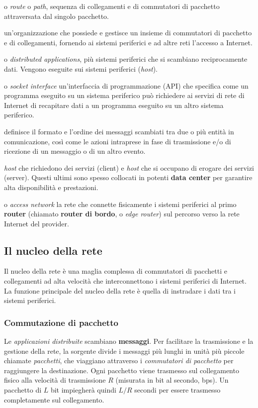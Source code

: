 \begin{description}[font=\sffamily\bfseries, leftmargin=1cm, style=nextline]
  \item[percorso]
    o \textit{route} o \textit{path}, sequenza di collegamenti e di commutatori di pacchetto attraversata dal singolo pacchetto. 
  \item[Internet ServiceProvider (ISP)]
    un'organizzazione che possiede e gestisce un insieme di commutatori di pacchetto e di collegamenti, fornendo ai sistemi periferici e ad altre reti l'accesso a Internet.
  \item[applicazioni distribuite]
    o \textit{distributed applications}, più sistemi periferici che si scambiano reciprocamente dati. Vengono eseguite sui sistemi periferici (\textit{host}).
  \item[interfaccia socket]
    o \textit{socket interface} un'interfaccia di programmazione (API) che specifica come un programma eseguito su un sistema periferico può richiedere ai servizi di rete di Internet di recapitare dati a un programma eseguito su un altro sistema periferico.
  \item[protocollo]
    definisce il formato e l’ordine dei messaggi scambiati tra due o più entità in comunicazione, così come le azioni intraprese in fase di trasmissione e/o di ricezione di un messaggio o di un altro evento.
  \item[client\server]
    \textit{host} che richiedono dei servizi (client) e \textit{host} che si occupano di erogare dei servizi (server). Questi ultimi sono spesso collocati in potenti \textbf{data center} per garantire alta disponibilità e prestazioni. 
  \item[reti di accesso]
    o \textit{access network} la rete che connette fisicamente i sistemi periferici al primo \textbf{router} (chiamato \textbf{router di bordo}, o \textit{edge router}) sul percorso verso la rete Internet del provider. 
\end{description}

\subsection{Il nucleo della rete}
Il nucleo della rete è una maglia complessa di commutatori di pacchetti e collegamenti ad alta velocità che interconnettono i sistemi periferici di Internet. La funzione principale del nucleo della rete è quella di instradare i dati tra i sistemi periferici.

\subsubsection{Commutazione di pacchetto}
Le \textit{applicazioni distribuite} scambiano \textbf{messaggi}. Per facilitare la trasmissione e la gestione della rete, la sorgente divide i messaggi più lunghi in unità più piccole chiamate \textit{pacchetti}, che viaggiano attraverso i \textit{commutatori di pacchetto} per raggiungere la destinazione. Ogni pacchetto viene trasmesso sul collegamento fisico alla velocità di trasmissione $R$ (misurata in bit al secondo, bps). Un pacchetto di $L$ bit impiegherà quindi $L/R$ secondi per essere trasmesso completamente sul collegamento.

